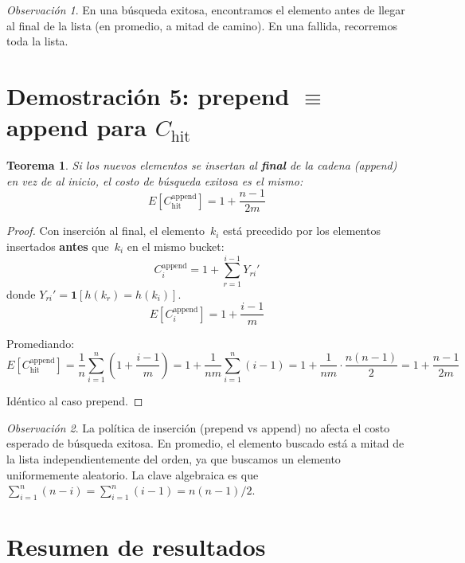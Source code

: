 \documentclass[11pt, letterpaper]{article}
\theoremstyle{definition}
\theoremstyle{plain}
\newtheorem{theorem}{Teorema}[section]
\theoremstyle{remark}
\newtheorem{remark}{Observación}[section]
\begin{document}
\begin{remark}
En una búsqueda exitosa, encontramos el elemento antes de llegar al
final de la lista (en promedio, a mitad de camino). En una fallida,
recorremos toda la lista.
\end{remark}

\section{Demostración 5: prepend $\equiv$ append para
  \texorpdfstring{$C_{\text{hit}}$}{C\_hit}}

\begin{theorem}\label{thm:prepend-append}
Si los nuevos elementos se insertan al \textbf{final} de la cadena
(append) en vez de al inicio, el costo de búsqueda exitosa es el
mismo:
\[
  E[C_{\text{hit}}^{\text{append}}] = 1 + \frac{n-1}{2m}
\]
\end{theorem}

\begin{proof}
Con inserción al final, el elemento~$k_i$ está precedido por los
elementos insertados \textbf{antes} que~$k_i$ en el mismo bucket:
\[
  C_i^{\text{append}} = 1 + \sum_{r=1}^{i-1} Y_{ri}'
\]
donde $Y_{ri}' = \mathbf{1}[h(k_r) = h(k_i)]$.
\[
  E[C_i^{\text{append}}] = 1 + \frac{i - 1}{m}
\]

Promediando:
\[
  E[C_{\text{hit}}^{\text{append}}]
  = \frac{1}{n}\sum_{i=1}^{n}\left(1 + \frac{i-1}{m}\right)
  = 1 + \frac{1}{nm}\sum_{i=1}^{n}(i{-}1)
  = 1 + \frac{1}{nm} \cdot \frac{n(n{-}1)}{2}
  = 1 + \frac{n-1}{2m}
\]

Idéntico al caso prepend.
\end{proof}

\begin{remark}
La política de inserción (prepend vs append) no afecta el costo
esperado de búsqueda exitosa. En promedio, el elemento buscado está a
mitad de la lista independientemente del orden, ya que buscamos un
elemento uniformemente aleatorio. La clave algebraica es que
$\sum_{i=1}^{n}(n{-}i) = \sum_{i=1}^{n}(i{-}1) = n(n{-}1)/2$.
\end{remark}

\section{Resumen de resultados}
\end{document}

